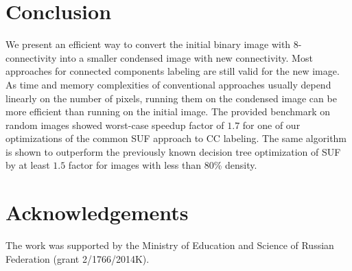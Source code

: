 \documentclass[hidelinks]{llncs}
\begin{document}
\section{Conclusion}

We present an efficient way to convert the initial binary image with
8-connectivity into a smaller condensed image with new connectivity.
Most approaches for connected components labeling are still valid
for the new image. As time and memory complexities of conventional
approaches usually depend linearly on the number of pixels, running
them on the condensed image can be more efficient than
running on the initial image. The provided benchmark on random images showed
worst-case speedup factor of $1.7$ for one of our optimizations of the common
SUF approach to CC labeling. The same algorithm is shown to outperform the
previously known decision tree optimization of SUF by at least $1.5$
factor for images with less than 80\% density.

\section{Acknowledgements}

The work was supported by the Ministry of Education and Science of Russian
Federation (grant 2/1766/2014K).
\end{document}
